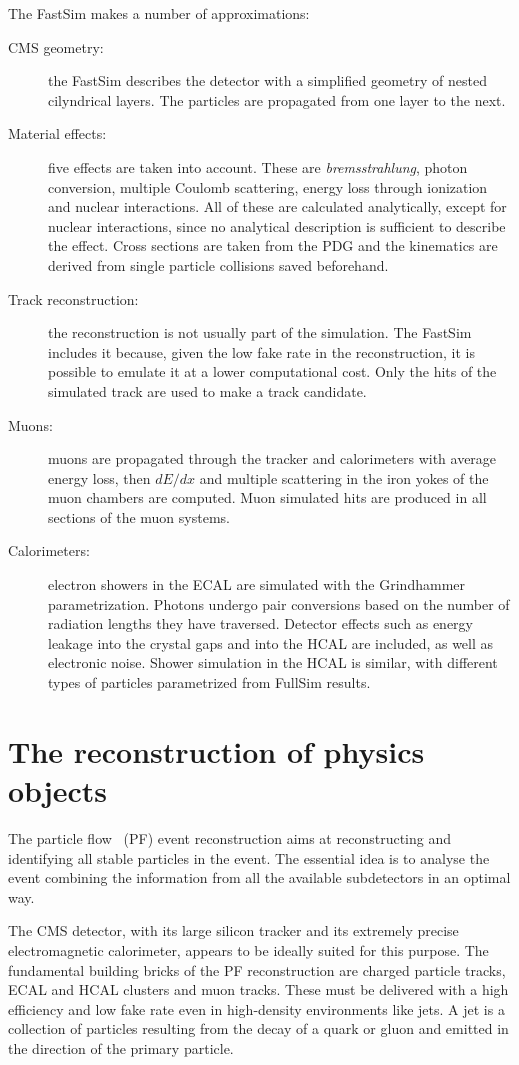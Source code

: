 The FastSim makes a number of approximations:
\begin{description}
    \item[CMS geometry:] the FastSim describes the detector with a simplified geometry of nested cilyndrical layers. The particles are propagated from one layer to the next.
    \item[Material effects:] five effects are taken into account. These are \emph{bremsstrahlung}, photon conversion, multiple Coulomb scattering, energy loss through ionization and nuclear interactions. All of these are calculated analytically, except for nuclear interactions, since no analytical description is sufficient to describe the effect. Cross sections are taken from the PDG and the kinematics are derived from single particle collisions saved beforehand.
    \item[Track reconstruction:] the reconstruction is not usually part of the simulation. The FastSim includes it because, given the low fake rate in the reconstruction, it is possible to emulate it at a lower computational cost. Only the hits of the simulated track are used to make a track candidate. 
    \item[Muons:] muons are propagated through the tracker and calorimeters with average energy loss, then $dE/dx$ and multiple scattering in the iron yokes of the muon chambers are computed. Muon simulated hits are produced in all sections of the muon systems.
    \item[Calorimeters:] electron showers in the ECAL are simulated with the Grindhammer~\cite{fs:grindhammer} parametrization. Photons undergo pair conversions based on the number of radiation lengths they have traversed. Detector effects such as energy leakage into the crystal gaps and into the HCAL are included, as well as electronic noise. Shower simulation in the HCAL is similar, with different types of particles parametrized from FullSim results.
\end{description}

\section{The reconstruction of physics objects}
The particle flow~\cite{pf:particle.flow} (PF) event reconstruction aims at reconstructing and identifying all stable particles in the event. The essential idea is to analyse the event combining the information from all the available subdetectors in an optimal way.

The CMS detector, with its large silicon tracker and its extremely precise electromagnetic calorimeter, appears to be ideally suited for this purpose. The fundamental building bricks of the PF reconstruction are charged particle tracks, ECAL and HCAL clusters and muon tracks. These must be delivered with a high efficiency and low fake rate even in high-density environments like jets. A jet is a collection of particles resulting from the decay of a quark or gluon and emitted in the direction of the primary particle. 

